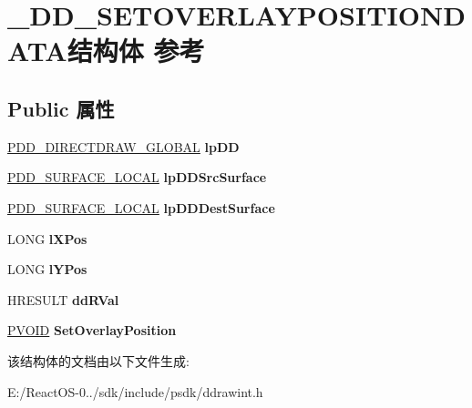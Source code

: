 \hypertarget{struct___d_d___s_e_t_o_v_e_r_l_a_y_p_o_s_i_t_i_o_n_d_a_t_a}{}\section{\+\_\+\+D\+D\+\_\+\+S\+E\+T\+O\+V\+E\+R\+L\+A\+Y\+P\+O\+S\+I\+T\+I\+O\+N\+D\+A\+T\+A结构体 参考}
\label{struct___d_d___s_e_t_o_v_e_r_l_a_y_p_o_s_i_t_i_o_n_d_a_t_a}
\subsection*{Public 属性}
\begin{DoxyCompactItemize}
\item 
\mbox{\label{struct___d_d___s_e_t_o_v_e_r_l_a_y_p_o_s_i_t_i_o_n_d_a_t_a_a9769109fc67d35111826242e163282d2}} 
\hyperlink{struct___d_d___d_i_r_e_c_t_d_r_a_w___g_l_o_b_a_l}{P\+D\+D\+\_\+\+D\+I\+R\+E\+C\+T\+D\+R\+A\+W\+\_\+\+G\+L\+O\+B\+AL} {\bfseries lp\+DD}
\item 
\mbox{\label{struct___d_d___s_e_t_o_v_e_r_l_a_y_p_o_s_i_t_i_o_n_d_a_t_a_a872ea6ab2aeaae3c95cf7a89aab799b7}} 
\hyperlink{struct___d_d___s_u_r_f_a_c_e___l_o_c_a_l}{P\+D\+D\+\_\+\+S\+U\+R\+F\+A\+C\+E\+\_\+\+L\+O\+C\+AL} {\bfseries lp\+D\+D\+Src\+Surface}
\item 
\mbox{\label{struct___d_d___s_e_t_o_v_e_r_l_a_y_p_o_s_i_t_i_o_n_d_a_t_a_a01c0894d4fb588dd0ec6987d64cce539}} 
\hyperlink{struct___d_d___s_u_r_f_a_c_e___l_o_c_a_l}{P\+D\+D\+\_\+\+S\+U\+R\+F\+A\+C\+E\+\_\+\+L\+O\+C\+AL} {\bfseries lp\+D\+D\+Dest\+Surface}
\item 
\mbox{\label{struct___d_d___s_e_t_o_v_e_r_l_a_y_p_o_s_i_t_i_o_n_d_a_t_a_ad9cba0d3684ff7077daf30daff5c4e24}} 
L\+O\+NG {\bfseries l\+X\+Pos}
\item 
\mbox{\label{struct___d_d___s_e_t_o_v_e_r_l_a_y_p_o_s_i_t_i_o_n_d_a_t_a_afa4e5c0660e95fae91d8d8bc45996b83}} 
L\+O\+NG {\bfseries l\+Y\+Pos}
\item 
\mbox{\label{struct___d_d___s_e_t_o_v_e_r_l_a_y_p_o_s_i_t_i_o_n_d_a_t_a_a3278277f5adfc32584e5d5b02e9b5738}} 
H\+R\+E\+S\+U\+LT {\bfseries dd\+R\+Val}
\item 
\mbox{\label{struct___d_d___s_e_t_o_v_e_r_l_a_y_p_o_s_i_t_i_o_n_d_a_t_a_aa6b558a5a30f7509be67c54136cc0b07}} 
\hyperlink{interfacevoid}{P\+V\+O\+ID} {\bfseries Set\+Overlay\+Position}
\end{DoxyCompactItemize}


该结构体的文档由以下文件生成\+:\begin{DoxyCompactItemize}
\item 
E\+:/\+React\+O\+S-\/0../sdk/include/psdk/ddrawint.\+h\end{DoxyCompactItemize}
